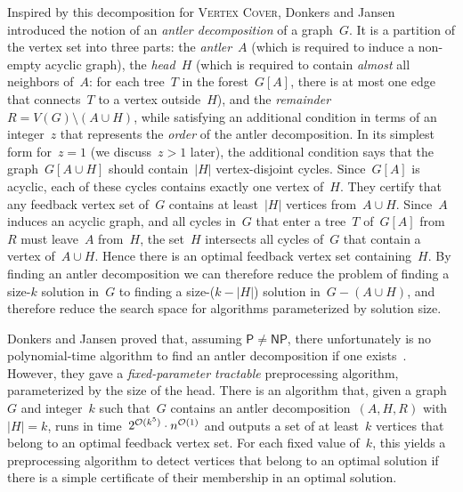 
Inspired by this decomposition for \textsc{Vertex Cover}, Donkers and Jansen~\cite{DonkersJ24} introduced the notion of an \emph{antler decomposition} of a graph~$G$. It is a partition of the vertex set into three parts: the \emph{antler}~$A$ (which is required to induce a non-empty acyclic graph), the \emph{head}~$H$ (which is required to contain \emph{almost} all neighbors of~$A$: for each tree~$T$ in the forest~$G[A]$, there is at most one edge that connects~$T$ to a vertex outside~$H$), and the \emph{remainder}~$R = V(G) \setminus (A \cup H)$, while satisfying an additional condition in terms of an integer~$z$ that represents the \emph{order} of the antler decomposition. In its simplest form for~$z=1$ (we discuss~$z > 1$ later), the additional condition says that the graph~$G[A \cup H]$ should contain~$|H|$ vertex-disjoint cycles. Since~$G[A]$ is acyclic, each of these cycles contains exactly one vertex of~$H$. They certify that any feedback vertex set of~$G$ contains at least~$|H|$ vertices from~$A \cup H$. Since~$A$ induces an acyclic graph, and all cycles in~$G$ that enter a tree~$T$ of~$G[A]$ from~$R$ must leave~$A$ from~$H$, the set~$H$ intersects all cycles of~$G$ that contain a vertex of~$A \cup H$. Hence there is an optimal feedback vertex set containing~$H$. By finding an antler decomposition we can therefore reduce the problem of finding a size-$k$ solution in~$G$ to finding a size-($k - |H|$) solution in~$G - (A \cup H)$, and therefore reduce the search space for algorithms parameterized by solution size.

Donkers and Jansen proved that, assuming $\mathsf{P} \neq \mathsf{NP}$, there unfortunately is no polynomial-time algorithm to find an antler decomposition if one exists~\cite[Theorem 3.4]{DonkersJ24}. However, they gave a \emph{fixed-parameter tractable} preprocessing algorithm, parameterized by the size of the head. There is an algorithm that, given a graph~$G$ and integer~$k$ such that~$G$ contains an antler decomposition~$(A,H,R)$ with~$|H| = k$, runs in time~$2^{\mathcal{O}(k^5)} \cdot n^{\mathcal{O}(1)}$ and outputs a set of at least~$k$ vertices that belong to an optimal feedback vertex set. For each fixed value of~$k$, this yields a preprocessing algorithm to detect vertices that belong to an optimal solution if there is a simple certificate of their membership in an optimal solution.

